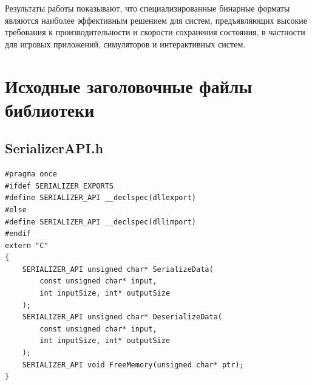 \documentclass[coursework]{SCWorks}
\begin{document}
Результаты работы показывают, что специализированные бинарные форматы являются наиболее эффективным решением для систем, предъявляющих высокие требования к производительности и скорости сохранения состояния, в частности для игровых приложений, симуляторов и интерактивных систем.







\appendix
\section{Исходные заголовочные файлы библиотеки}
\subsection{SerializerAPI.h}
\begin{verbatim}
#pragma once
#ifdef SERIALIZER_EXPORTS
#define SERIALIZER_API __declspec(dllexport)
#else
#define SERIALIZER_API __declspec(dllimport)
#endif
extern "C"
{
    SERIALIZER_API unsigned char* SerializeData(
        const unsigned char* input,
        int inputSize, int* outputSize
    );
    SERIALIZER_API unsigned char* DeserializeData(
        const unsigned char* input,
        int inputSize, int* outputSize
    );
    SERIALIZER_API void FreeMemory(unsigned char* ptr);
}
\end{verbatim}
\end{document}
